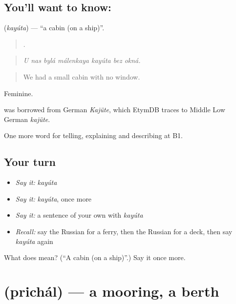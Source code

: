 \subsection*{You'll want to know: }
\textbf{} (\emph{kayúta}) — \textquotedblleft{}a cabin (on a ship)\textquotedblright{}.

\begin{quote}
      .
\end{quote}

\begin{quote}
\emph{U nas bylá málenkaya kayúta bez okná.}
\end{quote}

\begin{quote}
We had a small cabin with no window.
\end{quote}

Feminine.

\begin{cousinweb}
\emph{} was borrowed from German \emph{Kajüte}, which EtymDB traces to Middle Low German \emph{kajüte}.
\end{cousinweb}

\begin{grammarlens}[title={What you've built}]
One more word for telling, explaining and describing at B1.
\end{grammarlens}

\subsection*{Your turn}
\begin{itemize}
\raggedright
  \item \emph{Say it:} \emph{kayúta}
  \item \emph{Say it:} \emph{kayúta}, once more
  \item \emph{Say it:} a sentence of your own with \emph{kayúta}
  \item \emph{Recall:} say the Russian for a ferry, then the Russian for a deck, then say \emph{kayúta} again
\end{itemize}

\begin{tcolorbox}[breakable,colback=teal!4,colframe=teal!35!black,title={Before you move on}]
What does  mean? (\textquotedblleft{}A cabin (on a ship)\textquotedblright{}.) Say it once more.
\end{tcolorbox}
\section[\texorpdfstring{\ru{причал} (prichál)}{причал (prichál)}]{ (prichál) — a mooring, a berth}

